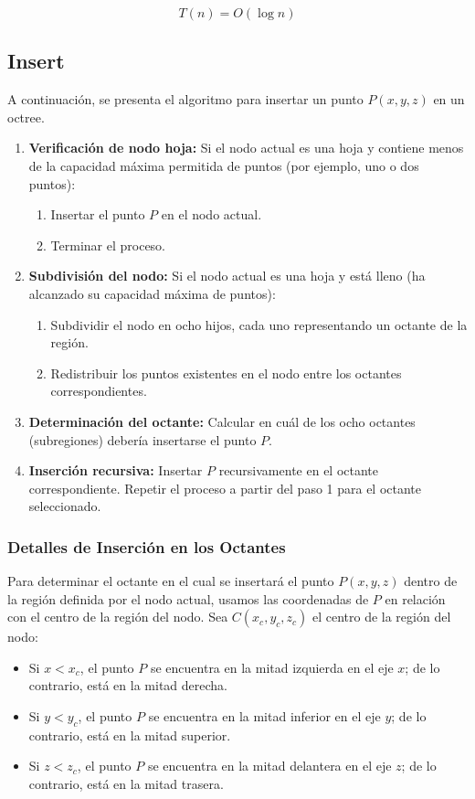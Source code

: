 \documentclass{article}
\begin{document}
\[
T(n) = O(\log n)
\]
\subsection{Insert}
A continuación, se presenta el algoritmo para insertar un punto \(P(x, y, z)\) en un octree. 

\begin{enumerate}
    \item \textbf{Verificación de nodo hoja:} Si el nodo actual es una hoja y contiene menos de la capacidad máxima permitida de puntos (por ejemplo, uno o dos puntos):
    \begin{enumerate}
        \item Insertar el punto \(P\) en el nodo actual.
        \item Terminar el proceso.
    \end{enumerate}
    \item \textbf{Subdivisión del nodo:} Si el nodo actual es una hoja y está lleno (ha alcanzado su capacidad máxima de puntos):
    \begin{enumerate}
        \item Subdividir el nodo en ocho hijos, cada uno representando un octante de la región.
        \item Redistribuir los puntos existentes en el nodo entre los octantes correspondientes.
    \end{enumerate}
    \item \textbf{Determinación del octante:} Calcular en cuál de los ocho octantes (subregiones) debería insertarse el punto \(P\).
    \item \textbf{Inserción recursiva:} Insertar \(P\) recursivamente en el octante correspondiente. Repetir el proceso a partir del paso 1 para el octante seleccionado.
\end{enumerate}

\subsubsection{Detalles de Inserción en los Octantes}

Para determinar el octante en el cual se insertará el punto \(P(x, y, z)\) dentro de la región definida por el nodo actual, usamos las coordenadas de \(P\) en relación con el centro de la región del nodo. Sea \(C(x_c, y_c, z_c)\) el centro de la región del nodo:

\begin{itemize}
    \item Si \(x < x_c\), el punto \(P\) se encuentra en la mitad izquierda en el eje \(x\); de lo contrario, está en la mitad derecha.
    \item Si \(y < y_c\), el punto \(P\) se encuentra en la mitad inferior en el eje \(y\); de lo contrario, está en la mitad superior.
    \item Si \(z < z_c\), el punto \(P\) se encuentra en la mitad delantera en el eje \(z\); de lo contrario, está en la mitad trasera.
\end{itemize}
\end{document}
